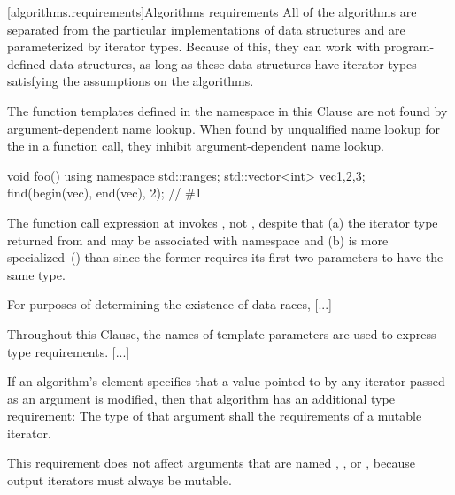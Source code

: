 [algorithms.requirements]{Algorithms requirements}
\pnum
All of the algorithms are separated from the particular implementations of data structures and are
parameterized by iterator types.
Because of this, they can work with program-defined data structures, as long
as these data structures have iterator types satisfying the assumptions on the algorithms.

\begin{addedblock}
\pnum
The function templates defined in the  namespace
in this Clause are not found by argument-dependent
name lookup. When found by
unqualified name lookup for the
 in a function call, they
inhibit argument-dependent name lookup.

\begin{example}
\begin{codeblock}
void foo() {
    using namespace std::ranges;
    std::vector<int> vec{1,2,3};
    find(begin(vec), end(vec), 2); // \#1
}
\end{codeblock}
The function call expression at  invokes ,
not , despite that (a) the iterator type returned from 
and  may be associated with namespace  and (b)
 is more specialized~() than
 since the former requires its first two parameters to
have the same type.
\end{example}
\end{addedblock}

\pnum
For purposes of determining the existence of data races, [...]

\pnum
Throughout this Clause, 
the names of template parameters are used to express type requirements. [...]

\pnum
If an algorithm's
\effects
element specifies that a value pointed to by any iterator passed
as an argument is modified, then that algorithm has an additional
type requirement:
The type of that argument shall  the requirements
of a mutable iterator.
\begin{note}
This requirement does not affect arguments that are named
,
,
or
,
because output iterators must always be mutable.
\end{note}

